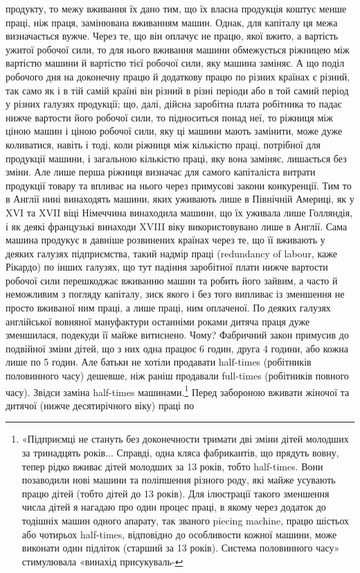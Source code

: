 продукту, то межу вживання їх дано тим, що їх власна продукція
коштує менше праці, ніж праця, замінювана вживанням машин.
Однак, для капіталу ця межа визначається вужче. Через те, що
він оплачує не працю, якої вжито, а вартість ужитої робочої
сили, то для нього вживання машини обмежується ріжницею
між вартістю машини й вартістю тієї робочої сили, яку машина
заміняє. А що поділ робочого дня на доконечну працю й додаткову
працю по різних країнах є різний, так само як і в тій самій
країні він різний в різні періоди або в той самий період у різних
галузях продукції; що, далі, дійсна заробітна плата робітника
то падає нижче вартости його робочої сили, то підноситься понад
неї, то ріжниця між ціною машин і ціною робочої сили, яку ці
машини мають замінити, може дуже коливатися, навіть і тоді,
коли ріжниця між кількістю праці, потрібної для продукції
машини, і загальною кількістю праці, яку вона заміняє, лишається
без зміни.  Але лише перша ріжниця визначає для самого
капіталіста витрати продукції товару та впливає на нього через
примусові закони конкуренції. Тим то в Англії нині винаходять
машини, яких уживають лише в Північній Америці, як у XVI
та XVII віці Німеччина винаходила машини, що їх уживала
лише Голляндія, і як деякі французькі винаходи XVIII віку
використовувано лише в Англії. Сама машина продукує в давніше
розвинених країнах через те, що її вживають у деяких галузях
підприємства, такий надмір праці (redundancy of labour, каже
Рікардо) по інших галузях, що тут падіння заробітної плати нижче
вартости робочої сили перешкоджає вживанню машин та робить
його зайвим, а часто й неможливим з погляду капіталу, зиск
якого і без того випливає із зменшення не просто вживаної ним
праці, а лише праці, ним оплаченої. По деяких галузях англійської
вовняної мануфактури останніми роками дитяча праця дуже
зменшилася, подекуди її майже витиснено. Чому? Фабричний
закон примусив до подвійної зміни дітей, що з них одна працює
6 годин, друга 4 години, або кожна лише по 5 годин. Але батьки
не хотіли продавати half-times (робітників половинного часу)
дешевше, ніж раніш продавали full-times (робітників повного
часу). Звідси заміна half-times машинами.\footnote{
«Підприємці не стануть без доконечности тримати дві зміни дітей
молодших за тринадцять років... Справді, одна кляса фабрикантів, що
прядуть вовну, тепер рідко вживає дітей молодших за 13 років, тобто
half-times. Вони позаводили нові машини та поліпшення різного роду,
які майже усувають працю дітей (тобто дітей до 13 років). Для ілюстрації
такого зменшення числа дітей я нагадаю про один процес праці, в якому
через додаток до тодішніх машин одного апарату, так званого piecing
machine, працю шістьох або чотирьох half-times, відповідно до особливости
кожної машини, може виконати один підліток (старший за
13 років). Система половинного часу» стимулювала «винахід присукуваль-
} Перед забороною
вживати жіночої та дитячої (нижче десятирічного віку) праці по